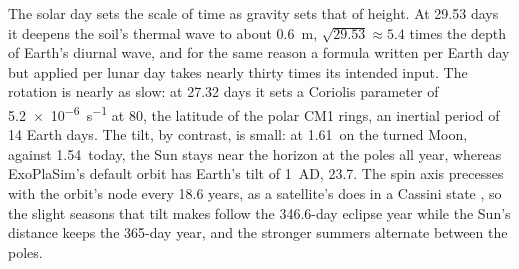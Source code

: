 The solar day sets the scale of time as gravity sets that of height. At 29.53 days it deepens the soil's thermal
wave to about 0.6~m, $\sqrt{29.53}\approx5.4$ times the depth of Earth's diurnal wave, and for the same reason a
formula written per Earth day but applied per lunar day takes nearly thirty times its intended input. The rotation
is nearly as slow: at 27.32 days it sets a Coriolis parameter of \SI{5.2e-6}{s^{-1}} at 80\textdegree, the
latitude of the polar CM1 rings, an inertial period of 14 Earth days. The tilt, by contrast, is small:
at 1.61\textdegree\ on the turned Moon, against 1.54\textdegree\ today, the Sun stays near the horizon at the poles all year, whereas ExoPlaSim's default orbit has Earth's tilt of 1~AD, 23.7\textdegree. The spin axis precesses
with the orbit's node every 18.6 years, as a satellite's does in a Cassini state \autocite{peale1969generalized}, so
the slight seasons that tilt makes follow the 346.6-day eclipse year while the Sun's distance keeps the 365-day year,
and the stronger summers alternate between the poles.
